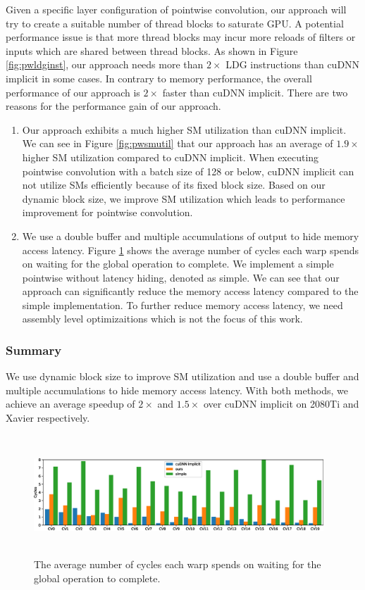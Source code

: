 Given a specific layer configuration of pointwise convolution, our approach will try to create a suitable number of thread blocks to saturate GPU. 
A potential performance issue is that more thread blocks may incur more reloads of filters or inputs which are shared between thread blocks. 
As shown in Figure \ref{fig:pwldginst}, our approach needs more than $2\times$ LDG instructions than cuDNN implicit in some cases.
In contrary to memory performance, the overall performance of our approach is $2\times$ faster than cuDNN implicit.
There are two reasons for the performance gain of our approach. 
\begin{enumerate}
	\item Our approach exhibits a much higher SM utilization than cuDNN implicit.
	We can see in Figure \ref{fig:pwsmutil} that our approach has an average of $1.9\times$ higher SM utilization compared to cuDNN implicit.
	When executing pointwise convolution with a batch size of 128 or below, cuDNN implicit can not utilize SMs efficiently because of its fixed block size. 
	Based on our dynamic block size, we improve SM utilization which leads to performance improvement for pointwise convolution.
	\item We use a double buffer and multiple accumulations of output to hide memory access latency.
	Figure \ref{fig:stalllongscore} shows the average number of cycles each warp spends on waiting for the global operation to complete. 
	We implement a simple pointwise without latency hiding, denoted as simple. 
	We can see that our approach can significantly reduce the memory access latency compared to the simple implementation.
	To further reduce memory access latency, we need assembly level optimizaitions which is not the focus of this work.
\end{enumerate}

\subsubsection{Summary} We use dynamic block size to improve SM utilization and use a double buffer and multiple accumulations to hide memory access latency. With both methods, we achieve an average speedup of $2\times$ and $1.5\times$ over cuDNN implicit on 2080Ti and Xavier respectively.


\begin{figure}
    \centering
    \includegraphics[width=0.97\textwidth,height=4.5cm]{./figure/longscore.eps}
    \caption{The average number of cycles each warp spends on waiting for the global operation to complete.}
    \label{fig:stalllongscore}
\end{figure}

